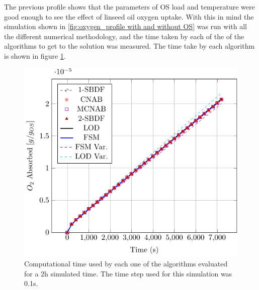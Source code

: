 \begin{refsection}
The previous profile shows that the parameters of OS load and temperature were good enough to see the effect of linseed oil oxygen uptake. With this in mind the simulation shown in \ref{fig:oxygen_profile with and without OS} was run with all the different numerical methodology, and the time taken by each of the of the algorithms to get to the solution was measured. The time take by each algorithm is shown in figure \ref{fig:bar_graph_comp_times}.

\begin{figure}[ht]
    \centering
    \includegraphics[width=0.65\linewidth,page=3]{Documento_Latex/Tesis_1/Imagenes/rozogafas.pdf}
    \caption{Computational time used by each one of the algorithms evaluated for a 2h simulated time. The time step used for this simulation was 0.1s.}
    \label{fig:bar_graph_comp_times}
\end{figure}


\end{refsection}
